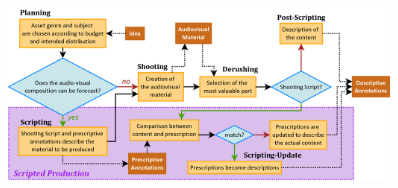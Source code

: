 



% 	





\begin{figure}[ht!]
\centering
\includegraphics[width=0.9\textwidth]{./images/Approach-Logigram-v2.png}
\caption{}
\label{img:strat-annot}
\end{figure}

